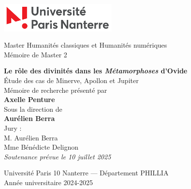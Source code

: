 \begin{titlepage}
    \noindent
    \begin{flushleft}
      \includegraphics[height=1.5cm]{logo-universite.png} 
    \end{flushleft}
    \vspace{1cm}
    
    \centering
    {\large Master Humanités classiques et Humanités numériques\\[0.1cm]
    Mémoire de Master 2\\[1.2cm]}
    
    \Huge\textbf{Le rôle des divinités dans les \textit{Métamorphoses} d’Ovide}\\[0.4cm]
    \huge{Étude des cas de Minerve, Apollon et Jupiter}\\[1.5cm]
    
    \Large
    Mémoire de recherche présenté par\\
    \textbf{Axelle Penture}\\[0.5cm]
    
    Sous la direction de\\
    \textbf{Aurélien Berra}\\[1cm]

    {\large Jury :}\\[0.2cm]
    {\large
    M. Aurélien Berra\\[0.2 cm]
    Mme Bénédicte Delignon\\[0.5cm]
    \textit{Soutenance prévue le 10 juillet 2025}\\[1cm]
    }

   \vfill
   {\large Université Paris 10 Nanterre — Département PHILLIA\\
   Année universitaire 2024-2025}
\end{titlepage}
